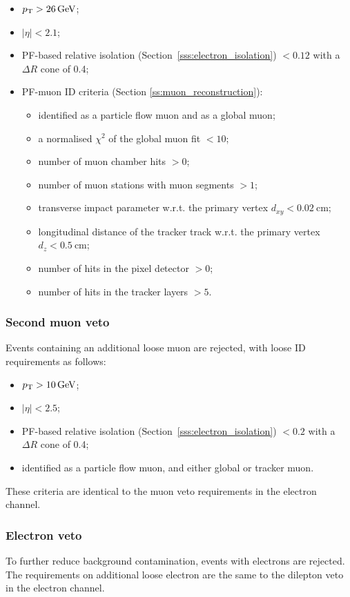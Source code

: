 \begin{itemize}
	\item $\pt > \SI{26}{\GeV}$;
	\item $|\eta| < 2.1$;
	\item PF-based relative isolation (Section~\ref{sss:electron_isolation}) \reliso $< 0.12$ with a $\Delta
R$ cone of \num{0.4};
	\item PF-muon ID criteria (Section \ref{ss:muon_reconstruction}):
	\begin{itemize}
		\item identified as a particle flow muon and as a global muon;
		\item a normalised $\chi^2$ of the global muon fit $<10$;
		\item number of muon chamber hits $>0$;
		\item number of muon stations with muon segments $>1$;
		\item transverse impact parameter w.r.t. the primary vertex $d_{xy} < \SI{0.02}{\cm}$;
		\item longitudinal distance of the tracker track w.r.t. the primary vertex $d_z < \SI{0.5}{\cm}$;
		\item number of hits in the pixel detector $>0$;
		\item number of hits in the tracker layers $>5$.
	\end{itemize}
\end{itemize}

\subsubsection*{Second muon veto}
Events containing an additional loose muon are rejected, with loose ID requirements as follows:

\begin{itemize}
	\item $\pt > \SI{10}{\GeV}$;
	\item $|\eta| < 2.5$;
	\item PF-based relative isolation (Section~\ref{sss:electron_isolation}) \reliso $< 0.2$ with a $\Delta R$ cone of
	\num{0.4}; %
	\item identified as a particle flow muon, and either global or tracker muon.
\end{itemize}

These criteria are identical to the muon veto requirements in the electron channel.

\subsubsection*{Electron veto}
To further reduce background contamination, events with electrons are rejected. The requirements on additional loose
electron are the same to the dilepton veto in the electron channel.

